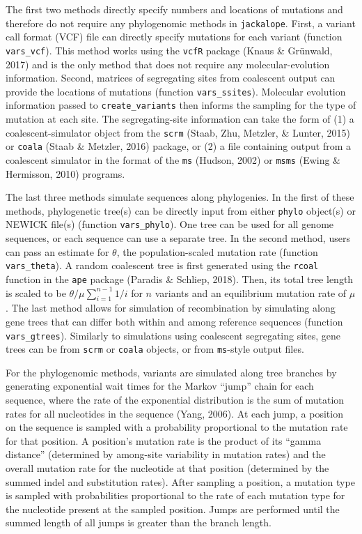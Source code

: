 \documentclass[12pt,]{article}
\begin{document}
The first two methods directly specify numbers and locations of mutations and
therefore do not require any phylogenomic methods in \texttt{jackalope}.
First, a variant call format (VCF) file can directly specify mutations for each
variant (function \texttt{vars\_vcf}).
This method works using the \texttt{vcfR} package
(Knaus \& Grünwald, 2017) and
is the only method that does not require any molecular-evolution information.
Second, matrices of segregating sites from coalescent output can provide the locations
of mutations (function \texttt{vars\_ssites}).
Molecular evolution information passed to \texttt{create\_variants} then informs the sampling
for the type of mutation at each site.
The segregating-site information can take the form of
(1) a coalescent-simulator object from the \texttt{scrm}
(Staab, Zhu, Metzler, \& Lunter, 2015) or
\texttt{coala} (Staab \& Metzler, 2016) package, or
(2) a file containing output from a coalescent simulator in the format of the
\texttt{ms} (Hudson, 2002) or
\texttt{msms} (Ewing \& Hermisson, 2010) programs.

The last three methods simulate sequences along phylogenies.
In the first of these methods,
phylogenetic tree(s) can be directly input from either \texttt{phylo} object(s) or
NEWICK file(s) (function \texttt{vars\_phylo}).
One tree can be used for all genome sequences, or each sequence can use a separate tree.
In the second method, users can pass an estimate for \(\theta\), the population-scaled
mutation rate (function \texttt{vars\_theta}).
A random coalescent tree is first generated using the \texttt{rcoal} function
in the \texttt{ape} package (Paradis \& Schliep, 2018).
Then, its total tree length is scaled to be
\(\theta / \mu \sum_{i=1}^{n-1}{1 / i}\) for \(n\) variants and an equilibrium
mutation rate of \(\mu\).
The last method allows for simulation of recombination by simulating along
gene trees that can differ both within and among reference sequences
(function \texttt{vars\_gtrees}).
Similarly to simulations using coalescent segregating sites, gene trees can be
from \texttt{scrm} or \texttt{coala} objects, or from \texttt{ms}-style output files.

For the phylogenomic methods, variants are simulated along tree branches by
generating exponential wait times
for the Markov ``jump'' chain for each sequence,
where the rate of the exponential distribution is the sum of mutation rates for
all nucleotides in the sequence (Yang, 2006).
At each jump, a position on the sequence is sampled with a probability proportional to
the mutation rate for that position.
A position's mutation rate is the product of its ``gamma distance''
(determined by among-site variability in mutation rates) and the overall mutation rate
for the nucleotide at that position
(determined by the summed indel and substitution rates).
After sampling a position, a mutation type is sampled with probabilities
proportional to the rate of each mutation type for the nucleotide
present at the sampled position.
Jumps are performed until the summed length of all jumps is greater than the
branch length.
\end{document}
